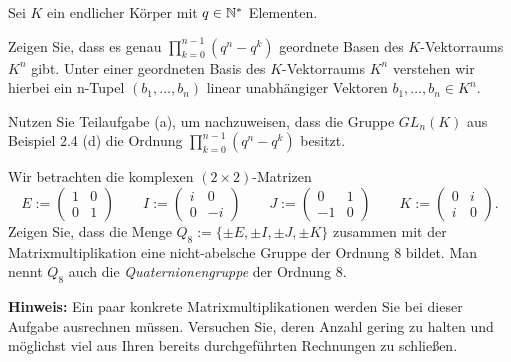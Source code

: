 \begin{Problem}
	Sei $K$ ein endlicher Körper mit $q \in \mathbb{N}^*$ Elementen.
	\begin{parts}
		\item Zeigen Sie, dass es genau $\prod_{k=0}^{n-1} (q^n-q^k)$ geordnete Basen des $K$-Vektorraums $K^n$ gibt. Unter einer geordneten Basis des $K$-Vektorraums $K^n$ verstehen wir hierbei ein n-Tupel $(b_1 , \dots, b_n)$ linear unabhängiger Vektoren $b_1, \dots, b_n \in K^n$.
		\item Nutzen Sie Teilaufgabe (a), um nachzuweisen, dass die Gruppe $GL_n(K)$ aus Beispiel 2.4 (d) die Ordnung $\prod_{k=0}^{n-1} (q^n-q^k) $ besitzt.
	\end{parts}
\end{Problem}
\begin{Problem}
	Wir betrachten die komplexen $(2 \times  2)$-Matrizen
	\[
		E:=\begin{pmatrix} 1 & 0 \\ 0 & 1 \end{pmatrix} \qquad I:=\begin{pmatrix} i & 0 \\ 0 & -i \end{pmatrix} \qquad J:=\begin{pmatrix} 0 & 1 \\ -1 & 0 \end{pmatrix} \qquad K:=\begin{pmatrix} 0 & i \\ i & 0 \end{pmatrix} 
	.\] 
	Zeigen Sie, dass die Menge $Q_8 := \{\pm E, \pm I, \pm J, \pm K\}$ zusammen mit der Matrixmultiplikation eine nicht-abelsche Gruppe der Ordnung 8 bildet. Man nennt $Q_8$ auch die \emph{Quaternionengruppe} der Ordnung 8.

	\textbf{Hinweis:}  Ein paar konkrete Matrixmultiplikationen werden Sie bei dieser Aufgabe ausrechnen müssen. Versuchen Sie, deren Anzahl gering zu halten und möglichst viel aus Ihren bereits durchgeführten Rechnungen zu schließen.
\end{Problem}
